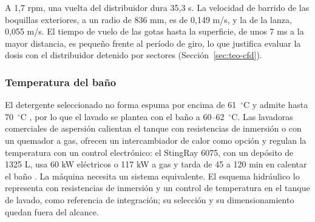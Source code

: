 A 1,7 rpm, una vuelta del distribuidor dura 35,3 s. La velocidad de barrido de las boquillas exteriores, a un radio de 836 mm, es de 0,149 m/s, y la de la lanza, 0,055 m/s. El tiempo de vuelo de las gotas hasta la superficie, de unos 7 ms a la mayor distancia, es pequeño frente al período de giro, lo que justifica evaluar la dosis con el distribuidor detenido por sectores (Sección~\ref{sec:teo-cfd}).

\subsubsection{Temperatura del baño}
\label{sec:calentamiento}

El detergente seleccionado no forma espuma por encima de 61~$^\circ$C y admite hasta 70~$^\circ$C \cite{zep36342}, por lo que el lavado se plantea con el baño a 60--62~$^\circ$C. Las lavadoras comerciales de aspersión calientan el tanque con resistencias de inmersión o con un quemador a gas, ofrecen un intercambiador de calor como opción y regulan la temperatura con un control electrónico: el StingRay 6075, con un depósito de 1325 L, usa 60 kW eléctricos o 117 kW a gas y tarda de 45 a 120 min en calentar el baño \cite{stingray_6075}. La máquina necesita un sistema equivalente. El esquema hidráulico lo representa con resistencias de inmersión y un control de temperatura en el tanque de lavado, como referencia de integración; su selección y su dimensionamiento quedan fuera del alcance.
